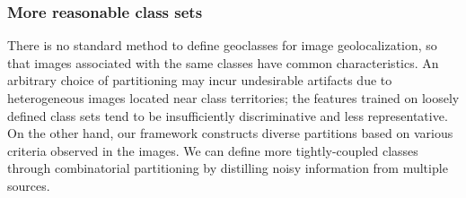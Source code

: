 \documentclass[runningheads]{llncs}
\begin{document}
\subsubsection{More reasonable class sets}
There is no standard method to define geoclasses for image geolocalization, so that images associated with the same classes have common characteristics.
An arbitrary choice of partitioning may incur undesirable artifacts due to heterogeneous images located near class territories; the features trained on loosely defined class sets tend to be insufficiently discriminative and less representative.
On the other hand, our framework constructs diverse partitions based on various criteria observed in the images. 
We can define more tightly-coupled classes through combinatorial partitioning by distilling noisy information from multiple sources.


\iffalse
\begin{figure}[t]
\centering
\begin{subfigure}[t]{0.31\linewidth}
\centering
\includegraphics[width=1\linewidth] {./figures/geoclasses/classset1.pdf}
\vspace{-0.23in}
\caption{Geoclass set 1}
\end{subfigure}
~~
\begin{subfigure}[t]{0.31\linewidth}
\centering
\includegraphics[width=1\linewidth] {./figures/geoclasses/classset2.pdf}
\vspace{-0.23in}
\caption{Geoclass set 2}
\end{subfigure}
~~
\begin{subfigure}[t]{0.31\linewidth}
\centering
\includegraphics[width=1\linewidth] {./figures/geoclasses/classset3.pdf}
\vspace{-0.23in}
\caption{Geoclass set 3}
\end{subfigure}

\vspace{0.08in}

\begin{subfigure}[t]{0.31\linewidth}
\centering
\includegraphics[width=1\linewidth] {./figures/geoclasses/classset4.pdf}
\vspace{-0.23in}
\caption{Geoclass set 4}
\end{subfigure}
~~
\begin{subfigure}[t]{0.31\linewidth}
\centering
\includegraphics[width=1\linewidth] {./figures/geoclasses/classset5.pdf}
\vspace{-0.23in}
\caption{Geoclass set 5}
\end{subfigure}
\caption{
Visualization of the geoclass sets on the maps of the United States generated by the parameters shown in Table~\ref{tab:geoclass}. 
Each distinct region is marked by a different color.
The first two sets, (a) and (b), are generated by manually designed parameters while parameters for the others are randomly sampled.
}
\label{fig:class_set}
\end{figure}
\fi
\end{document}

